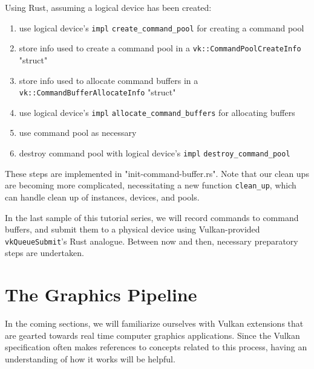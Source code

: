 \documentclass[12pt,letterpaper]{article}
\newcommand{\ril}[1]{\texttt{#1}}
\newcommand{\cil}[1]{\texttt{#1}}
\begin{document}
	Using Rust, assuming a logical device has been created:
		\begin{enumerate}
            \item use logical device's \ril{impl} \ril{create_command_pool} for creating a command pool
            
			\item store info used to create a command pool in a \ril{vk::CommandPoolCreateInfo} "struct"
			
			\item store info used to allocate command buffers in a \ril{vk::CommandBufferAllocateInfo} "struct"
			
			\item use logical device's \ril{impl} \ril{allocate_command_buffers} for allocating buffers
			
			\item use command pool as necessary
			
			\item destroy command pool with logical device's \ril{impl} \ril{destroy_command_pool}
		\end{enumerate}
    
	These steps are implemented in "init-command-buffer.rs". Note that our clean ups are becoming more complicated, necessitating a new function \ril{clean_up}, which can handle clean up of instances, devices, and pools. 
	
	In the last sample of this tutorial series, we will record commands to command buffers, and submit them to a physical device using Vulkan-provided \cil{vkQueueSubmit}'s Rust analogue. Between now and then, necessary preparatory steps are undertaken.

\section{The Graphics Pipeline}
    In the coming sections, we will familiarize ourselves with Vulkan extensions that are gearted towards real time computer graphics applications. Since the Vulkan specification often makes references to concepts related to this process, having an understanding of how it works will be helpful.
\end{document}
